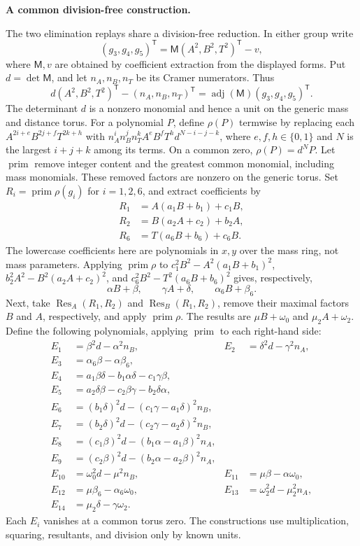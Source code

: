\documentclass[11pt]{amsart}
\newcommand{\topic}[1]{\par\addvspace{1.4ex}\noindent\textbf{#1}\par\nobreak\smallskip\noindent}
\theoremstyle{definition}\newtheorem{definition}[theorem]{Definition}\theoremstyle{remark}\newtheorem{remark}[theorem]{Remark}
\begin{document}
\topic{A common division-free construction.} The two elimination replays share a division-free reduction. In either group write
\[
 (g_3,g_4,g_5)^{\mathsf T}=
 \mathsf M(A^2,B^2,T^2)^{\mathsf T}-v,
\]
where $\mathsf M,v$ are obtained by coefficient extraction from the displayed forms. Put $d=\det\mathsf M$, and let $n_A,n_B,n_T$ be its Cramer numerators. Thus
\[
 d(A^2,B^2,T^2)^{\mathsf T}-(n_A,n_B,n_T)^{\mathsf T}
       =\operatorname{adj}(\mathsf M)(g_3,g_4,g_5)^{\mathsf T}.
\]
The determinant $d$ is a nonzero monomial and hence a unit on the generic mass and distance torus. For a polynomial $P$, define $\rho(P)$ termwise by replacing each $A^{2i+e}B^{2j+f}T^{2k+h}$ with
$n_A^i n_B^j n_T^k A^eB^fT^h d^{N-i-j-k}$, where $e,f,h\in\{0,1\}$ and $N$ is the largest $i+j+k$ among its terms. On a common zero, $\rho(P)=d^NP$.
Let $\operatorname{prim}$ remove integer content and the greatest common monomial, including mass monomials. These removed factors are nonzero on the generic torus. Set $R_i=\operatorname{prim}\rho(g_i)$ for $i=1,2,6$, and extract coefficients by
\[
 \begin{aligned}
 R_1&=A(a_1B+b_1)+c_1B,\\
 R_2&=B(a_2A+c_2)+b_2A,\\
 R_6&=T(a_6B+b_6)+c_6B.
 \end{aligned}
\]
The lowercase coefficients here are polynomials in $x,y$ over the mass ring, not mass parameters. Applying $\operatorname{prim}\rho$ to
$c_1^2B^2-A^2(a_1B+b_1)^2$,
$b_2^2A^2-B^2(a_2A+c_2)^2$, and
$c_6^2B^2-T^2(a_6B+b_6)^2$ gives, respectively,
\[
 \alpha B+\beta,\qquad \gamma A+\delta,\qquad \alpha_6B+\beta_6.
\]
Next, take $\operatorname{Res}_A(R_1,R_2)$ and $\operatorname{Res}_B(R_1,R_2)$, remove their maximal factors $B$ and $A$, respectively, and apply $\operatorname{prim}\rho$. The results are $\mu B+\omega_0$ and $\mu_2A+\omega_2$. Define the following polynomials, applying $\operatorname{prim}$ to each right-hand side:
\begin{align*}
 E_1&=\beta^2d-\alpha^2n_B,& E_2&=\delta^2d-\gamma^2n_A,\\
 E_3&=\alpha_6\beta-\alpha\beta_6,\\
 E_4&=a_1\beta\delta-b_1\alpha\delta-c_1\gamma\beta,\\
 E_5&=a_2\delta\beta-c_2\beta\gamma-b_2\delta\alpha,\\
 E_6&=(b_1\delta)^2d-(c_1\gamma-a_1\delta)^2n_B,\\
 E_7&=(b_2\delta)^2d-(c_2\gamma-a_2\delta)^2n_B,\\
 E_8&=(c_1\beta)^2d-(b_1\alpha-a_1\beta)^2n_A,\\
 E_9&=(c_2\beta)^2d-(b_2\alpha-a_2\beta)^2n_A,\\
 E_{10}&=\omega_0^2d-\mu^2n_B,&E_{11}&=\mu\beta-\alpha\omega_0,\\
 E_{12}&=\mu\beta_6-\alpha_6\omega_0,&E_{13}&=\omega_2^2d-\mu_2^2n_A,\\
 E_{14}&=\mu_2\delta-\gamma\omega_2.
\end{align*}
Each $E_i$ vanishes at a common torus zero. The constructions use multiplication, squaring, resultants, and division only by known units.
\end{document}
